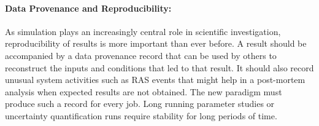 \documentclass{article}
\newcommand{\ngrm}{NGRM}
\begin{document}
\paragraph{Data Provenance and Reproducibility:}
As simulation plays an increasingly central role in scientific
investigation, reproducibility of results is more important than ever
before. A result should be accompanied by a data provenance record that
can be used by others to reconstruct the inputs and conditions that led to
that result. It should also record unusual system activities 
such as RAS events that might help in a post-mortem analysis 
when expected results are not obtained.
The new paradigm must produce such a record for every job.
Long running parameter studies or uncertainty quantification runs
require stability for long periods of time. 
%


%
%
\end{document}
